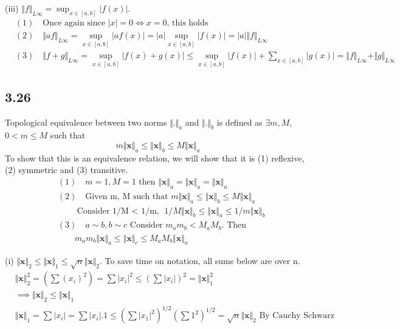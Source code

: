 \documentclass{article}
\begin{document}
	(iii) $\Vert f \Vert_{L \infty} = \sup_{x \in [a,b]} |f(x)|$.
	\begin{align*}
	&(1) \quad \text{Once again since $|x| = 0 \iff x = 0$, this holds} \\
	&(2) \quad \Vert af \Vert_{L\infty} = \sup_{x \in [a,b]} |a f(x)| = |a| \sup_{x \in [a,b]} |f(x)| = |a| \Vert f \Vert_{L\infty} \\
	&(3) \quad \Vert f + g \Vert_{L\infty} = \sup_{x \in [a,b]}|f(x) + g(x)| \leq \sup_{x \in [a,b]} |f(x)| + \sum_{x \in [a,b]} |g(x)| = \Vert f \Vert_{L\infty} + \Vert g \Vert_{L\infty}
	\end{align*}
	
	\subsection*{3.26}
	Topological equivalence between two norms $\Vert. \Vert_a$ and $\Vert. \Vert_b$ is defined as $\exists m, M$, $0 < m \leq M$ such that
	\[ m \Vert \mathbf{x} \Vert_a \leq \Vert \mathbf{x} \Vert_b \leq M \Vert \mathbf{x} \Vert_a \]
	To show that this is an equivalence relation, we will show that it is (1) reflexive, (2) symmetric and (3) transitive.
	\begin{align*}
	&(1) \quad m = 1, M = 1 \text{ then } \Vert \mathbf{x} \Vert_a = \Vert \mathbf{x} \Vert_a = \Vert \mathbf{x} \Vert_a \\
	&(2) \quad \text{Given m, M such that } m \Vert \mathbf{x} \Vert_a  \leq \Vert \mathbf{x} \Vert_b \leq M \Vert \mathbf{x} \Vert_a \\
	& \quad \quad \text{Consider 1/M $<$ 1/m, } 1/M \Vert \mathbf{x} \Vert_b \leq \Vert \mathbf{x} \Vert_a \leq 1/m \Vert \mathbf{x} \Vert_b \\
	&(3) \quad a \sim b, b \sim c \text{ Consider $m_a m_b < M_a M_b$. Then } \\
	&\quad \quad m_a m_b \Vert \mathbf{x} \Vert_a \leq \Vert \mathbf{x} \Vert_c \leq M_a M_b \Vert \mathbf{x} \Vert_a
	\end{align*}
	
	(i) $\Vert \mathbf{x} \Vert_2 \leq \Vert \mathbf{x} \Vert_1 \leq \sqrt{n} \Vert \mathbf{x} \Vert_2$. To save time on notation, all sums below are over n.
	\begin{align*}
	 &\Vert \mathbf{x} \Vert_2^2 = (\sum (x_i)^2) = \sum |x_i|^2 \leq (\sum |x_i|)^2 = \Vert \mathbf{x} \Vert_1^2 \\
	 &\implies \Vert \mathbf{x} \Vert_2 \leq \Vert \mathbf{x} \Vert_1 \\
	 &\Vert \mathbf{x} \Vert_1 = \sum |x_i| = \sum |x_i| .1 \leq (\sum |x_1|^2)^{1/2}(\sum 1^2)^{1/2} = \sqrt{n} \Vert \mathbf{x} \Vert_2 \text{ By Cauchy Schwarz}
	\end{align*}
	
\end{document}
